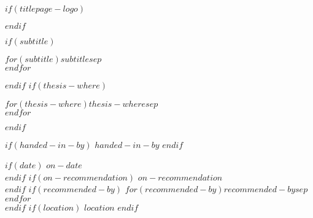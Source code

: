 \begin{titlepage}
\makeatletter
$if(titlepage-logo)$
\begin{center}

\end{center}
$endif$
\vspace{1cm}
\begin{center}
\fontsize{22pt}{24pt}\selectfont\textbf{\@title}
\end{center}
$if(subtitle)$
\begin{center}
\fontsize{16pt}{18pt}\selectfont
$for(subtitle)$$subtitle$$sep$\\ $endfor$\\
\end{center}
$endif$
\vspace{1cm}
$if(thesis-where)$
\begin{center}
$for(thesis-where)$$thesis-where$$sep$\\ $endfor$
\end{center}
$endif$
\begin{center}
$if(handed-in-by)$
$handed-in-by$
$endif$
\end{center}
\begin{center}
\textbf{\@author}
\end{center}
\begin{center}
$if(date)$
$on-date$ \@date\\
$endif$
$if(on-recommendation)$
$on-recommendation$\\
$endif$
$if(recommended-by)$
\vspace{0.5cm}
$for(recommended-by)$$recommended-by$$sep$\\ $endfor$\\
$endif$
$if(location)$
\vfill
$location$
\vspace{1cm}
$endif$
\end{center}
\makeatother
\end{titlepage}
